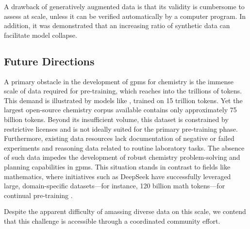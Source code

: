 A drawback of generatively augmented data is that its validity is cumbersome to assess at scale, unless it can be verified automatically by a computer program. 
In addition, it was demonstrated that an increasing ratio of synthetic data can facilitate model collapse.\autocite{kazdan2024collapse,shumailov2024ai}

\subsection{Future Directions}

A primary obstacle in the development of \glspl{gpm} for chemistry is the immense scale of data required for pre-training, which reaches into the trillions of tokens. This demand is illustrated by models like , trained on 15 trillion tokens. Yet the largest open-source chemistry corpus available contains only approximately 75 billion tokens.\autocite{mirza2025chempile0} 
Beyond its insufficient volume, this dataset is constrained by restrictive licenses and is not ideally suited for the primary pre-training phase. Furthermore, existing data resources lack documentation of negative or failed experiments and reasoning data related to routine laboratory tasks. The absence of such data impedes the development of robust chemistry problem-solving and planning capabilities in \glspl{gpm}. 
This situation stands in contrast to fields like mathematics, where initiatives such as DeepSeek have successfully leveraged large, domain-specific datasets---for instance, 120 billion math tokens---for continual pre-training \autocite{shao2024deepseekmath0}.

Despite the apparent difficulty of amassing diverse data on this scale, we contend that this challenge is accessible through a coordinated community effort. 